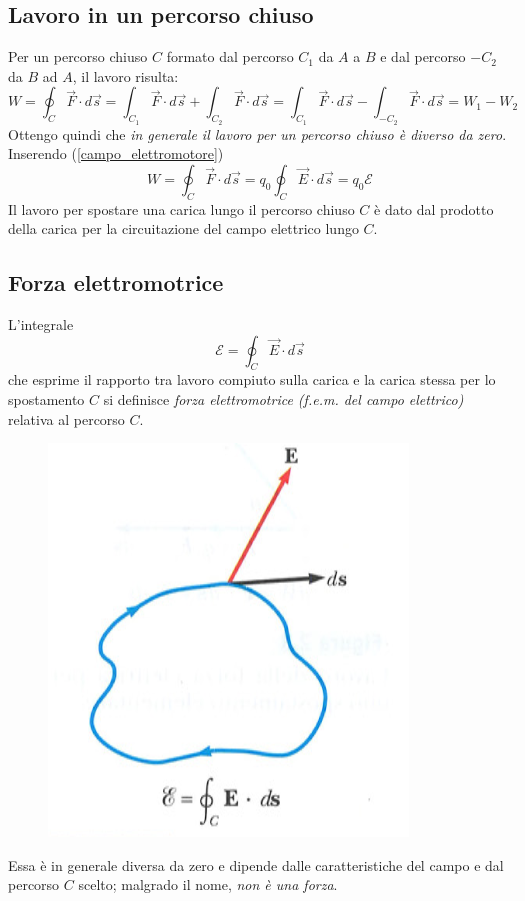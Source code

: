 \documentclass[class=book, crop=false, oneside, 12pt]{standalone}
\begin{document}
\subsection{Lavoro in un percorso chiuso}

Per un percorso chiuso \(C\) formato dal percorso \(C_1\) da \(A\) a \(B\) e dal percorso \(-C_2\) da \(B\) ad \(A\), il lavoro risulta:
\begin{equation*}
    W = \oint_{C} \overrightarrow{F} \cdot d \overrightarrow{s} = \int_{C_1} \overrightarrow{F} \cdot d \overrightarrow{s} + \int_{C_2} \overrightarrow{F} \cdot d \overrightarrow{s} = \int_{C_1} \overrightarrow{F} \cdot d \overrightarrow{s} - \int_{-C_2} \overrightarrow{F} \cdot d \overrightarrow{s} = W_1 - W_2
\end{equation*}
Ottengo quindi che \emph{in generale il lavoro per un percorso chiuso è diverso da zero}. Inserendo (\ref{campo_elettromotore})
\begin{equation}
    W = \oint_{C} \overrightarrow{F} \cdot d \overrightarrow{s} = q_0 \oint_{C} \overrightarrow{E} \cdot d \overrightarrow{s} = q_0 \mathcal{E}
\end{equation}
Il lavoro per spostare una carica lungo il percorso chiuso \(C\) è dato dal prodotto della carica per la circuitazione del campo elettrico lungo \(C\).

\subsection{Forza elettromotrice}

L'integrale 
\begin{equation}
    \mathcal{E} = \oint_C \overrightarrow{E} \cdot d \overrightarrow{s}
\end{equation}
che esprime il rapporto tra lavoro compiuto sulla carica e la carica stessa per lo spostamento \(C\) si definisce \emph{forza elettromotrice (f.e.m. del campo elettrico)} relativa al percorso \(C\).
\begin{figure}[h]
    \includegraphics[scale=0.5]{circuitazione.png}
    \centering
    \caption{}
\end{figure}
Essa è in generale diversa da zero e dipende dalle caratteristiche del campo e dal percorso \(C\) scelto; malgrado il nome, \emph{non è una forza}.
\end{document}
